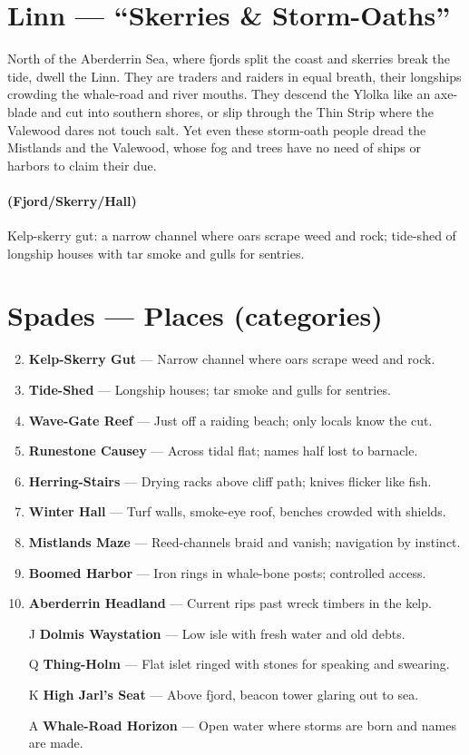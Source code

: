 \section{Linn --- ``Skerries \& Storm-Oaths''}
\label{chap:linn}

\begin{tcolorbox}[colback=black!3,colframe=black!40!white,title={Theme \& Atmosphere}]
North of the Aberderrin Sea, where fjords split the coast and skerries break the tide, dwell the Linn. They are traders and raiders in equal breath, their longships crowding the whale-road and river mouths. They descend the Ylolka like an axe-blade and cut into southern shores, or slip through the Thin Strip where the Valewood dares not touch salt. Yet even these storm-oath people dread the Mistlands and the Valewood, whose fog and trees have no need of ships or harbors to claim their due.
\end{tcolorbox}

\paragraph*{(Fjord/Skerry/Hall)} Kelp-skerry gut: a narrow channel where oars scrape weed and rock; tide-shed of longship houses with tar smoke and gulls for sentries.

\section*{Spades --- Places (categories)}
\label{sec:linn-places}
\begin{enumerate}
\setcounter{enumi}{1}
\item \textbf{Kelp-Skerry Gut} --- Narrow channel where oars scrape weed and rock.
\item \textbf{Tide-Shed} --- Longship houses; tar smoke and gulls for sentries.
\item \textbf{Wave-Gate Reef} --- Just off a raiding beach; only locals know the cut.
\item \textbf{Runestone Causey} --- Across tidal flat; names half lost to barnacle.
\item \textbf{Herring-Stairs} --- Drying racks above cliff path; knives flicker like fish.
\item \textbf{Winter Hall} --- Turf walls, smoke-eye roof, benches crowded with shields.
\item \textbf{Mistlands Maze} --- Reed-channels braid and vanish; navigation by instinct.
\item \textbf{Boomed Harbor} --- Iron rings in whale-bone posts; controlled access.
\item \textbf{Aberderrin Headland} --- Current rips past wreck timbers in the kelp.
\item[J] \textbf{Dolmis Waystation} --- Low isle with fresh water and old debts.
\item[Q] \textbf{Thing-Holm} --- Flat islet ringed with stones for speaking and swearing.
\item[K] \textbf{High Jarl's Seat} --- Above fjord, beacon tower glaring out to sea.
\item[A] \textbf{Whale-Road Horizon} --- Open water where storms are born and names are made.
\end{enumerate}

